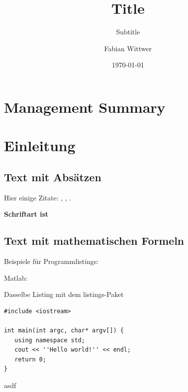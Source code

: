 \documentclass[
  10pt, %
  a4paper, %
  twoside, %
  openright, %
  numbers=noenddot, %
  BCOR=5mm, %
  parskip=half*, %
  thesis, %
]{bfhbook}
\author{Fabian Wittwer}
\title{Title}
\subtitle{Subtitle}
\date{\today} %
\begin{document}
\maketitle

\frontmatter %
\allowdisplaybreaks

\tableofcontents

\sloppy
\mainmatter %
\chapter*{Management Summary}
\chapter{Einleitung}
\section{Text mit Absätzen}
Hier einige Zitate: \cite{Einstein1923}, \cite{NS87a}, \cite{SH96}.

{\Large \textbf{Schriftart ist \testfont}}

\Blindtext
\section{Text mit mathematischen Formeln}
\blindmathpaper

Beispiele für Programmlistings:

Matlab:


Dasselbe Listing mit dem listings-Paket
\lstset{language=C}
\begin{lstlisting}
#include <iostream>

int main(int argc, char* argv[]) {
   using namespace std;
   cout << ''Hello world!'' << endl;
   return 0;
}
\end{lstlisting}

\blindtext asdf
\end{document}
